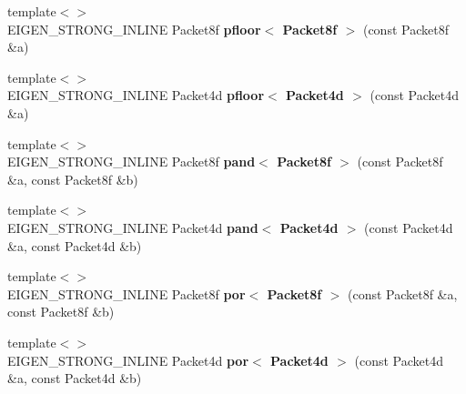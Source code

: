 \begin{DoxyCompactItemize}
\item 
\mbox{\label{namespace_eigen_1_1internal_a15ddcdd3cce26de3303133d5b75f9eb8}} 
{\footnotesize template$<$$>$ }\\E\+I\+G\+E\+N\+\_\+\+S\+T\+R\+O\+N\+G\+\_\+\+I\+N\+L\+I\+NE Packet8f {\bfseries pfloor$<$ Packet8f $>$} (const Packet8f \&a)
\item 
\mbox{\label{namespace_eigen_1_1internal_aec4ef84ef25a5c26239fb9580ad196a5}} 
{\footnotesize template$<$$>$ }\\E\+I\+G\+E\+N\+\_\+\+S\+T\+R\+O\+N\+G\+\_\+\+I\+N\+L\+I\+NE Packet4d {\bfseries pfloor$<$ Packet4d $>$} (const Packet4d \&a)
\item 
\mbox{\label{namespace_eigen_1_1internal_a99285234a5a8623397e915edd13a8351}} 
{\footnotesize template$<$$>$ }\\E\+I\+G\+E\+N\+\_\+\+S\+T\+R\+O\+N\+G\+\_\+\+I\+N\+L\+I\+NE Packet8f {\bfseries pand$<$ Packet8f $>$} (const Packet8f \&a, const Packet8f \&b)
\item 
\mbox{\label{namespace_eigen_1_1internal_ac2660f881609537339298ab45907bedd}} 
{\footnotesize template$<$$>$ }\\E\+I\+G\+E\+N\+\_\+\+S\+T\+R\+O\+N\+G\+\_\+\+I\+N\+L\+I\+NE Packet4d {\bfseries pand$<$ Packet4d $>$} (const Packet4d \&a, const Packet4d \&b)
\item 
\mbox{\label{namespace_eigen_1_1internal_a942b2308dde2e669adf589d745cd6d8e}} 
{\footnotesize template$<$$>$ }\\E\+I\+G\+E\+N\+\_\+\+S\+T\+R\+O\+N\+G\+\_\+\+I\+N\+L\+I\+NE Packet8f {\bfseries por$<$ Packet8f $>$} (const Packet8f \&a, const Packet8f \&b)
\item 
\mbox{\label{namespace_eigen_1_1internal_aeed577308a3d27351a2c37dd98bfed7a}} 
{\footnotesize template$<$$>$ }\\E\+I\+G\+E\+N\+\_\+\+S\+T\+R\+O\+N\+G\+\_\+\+I\+N\+L\+I\+NE Packet4d {\bfseries por$<$ Packet4d $>$} (const Packet4d \&a, const Packet4d \&b)
\item 
\mbox{\label{namespace_eigen_1_1internal_a35c8edefa0e36addeec032eb8b0d5f37}} 

\end{DoxyCompactItemize}
